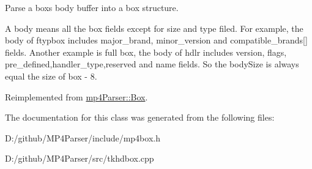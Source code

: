Parse a box\textquotesingle{}s body buffer into a box structure. 

A body means all the box fields except for size and type filed. For example, the body of ftypbox includes major\+\_\+brand, minor\+\_\+version and compatible\+\_\+brands\mbox{[}\mbox{]} fields. Another example is full box, the body of hdlr includes version, flags, pre\+\_\+defined,handler\+\_\+type,reserved and name fields. So the body\+Size is always equal the size of box -\/ 8. 

Reimplemented from \mbox{\hyperlink{classmp4_parser_1_1_box_a3dd0c084ac65bc77b69ac5ecaf796cb2}{mp4\+Parser\+::\+Box}}.



The documentation for this class was generated from the following files\+:\begin{DoxyCompactItemize}
\item 
D\+:/github/\+M\+P4\+Parser/include/mp4box.\+h\item 
D\+:/github/\+M\+P4\+Parser/src/tkhdbox.\+cpp\end{DoxyCompactItemize}
